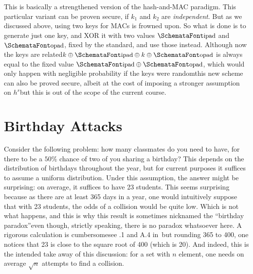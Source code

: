   This is basically a strengthened version of the hash-and-MAC paradigm. This particular variant can be proven secure, if $k_1$ and $k_2$ are \emph{independent}. But as we discussed above, using two keys for MACs is frowned upon. So what is done is to generate just one key, and XOR it with two values $\myemph{ipad}$ and $\myemph{opad}$, fixed by the standard, and use those instead. Although now the keys are related\emd $k \oplus \myemph{ipad} \oplus k \oplus \myemph{opad}$ is always equal to the fixed value $\myemph{ipad} \oplus \myemph{opad}$, which would only happen with negligible probability if the keys were random\emd this new scheme can also be proved secure, albeit at the cost of imposing a stronger assumption on $h^s$\emd but this is out of the scope of the current course.

\section{Birthday Attacks}
  \label{sec:birthday_attacks}
  Consider the following problem: how many classmates do you need to have, for there to be a $50\%$ chance of two of you sharing a birthday? This depends on the distribution of birthdays throughout the year, but for current purposes it suffices to assume a uniform distribution. Under this assumption, the answer might be surprising: on average, it suffices to have 23 students. This seems surprising because as there are at least 365 days in a year, one would intuitively suppose that with 23 students, the odds of a collision would be quite low. Which is not what happens, and this is why this result is sometimes nicknamed the ``birthday paradox''\emd even though, strictly speaking, there is no paradox whatsoever here. A rigorous calculation is cumbersome\emd see .1 and \ts A.4 in~\cite{KatzLindell:IMC}\emd but rounding 365 to 400, one notices that 23 is close to the square root of 400 (which is 20). And indeed, this is the intended take away of this discussion: for a set with $n$ element, one needs on average $\sqrt{n}$ attempts to find a collision.

